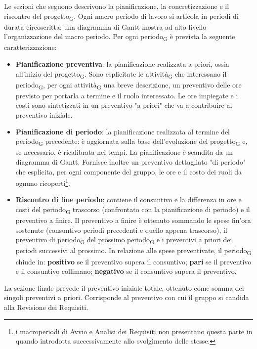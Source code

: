 Le sezioni che seguono descrivono la pianificazione, la concretizzazione e il riscontro del progetto\textsubscript{G}. Ogni macro periodo di lavoro si articola in periodi di durata circoscritta: una diagramma di Gantt mostra ad alto livello l'organizzazione del macro periodo. Per ogni periodo\textsubscript{G} è prevista la seguente caratterizzazione:
\begin{itemize}
	\item \textbf{Pianificazione preventiva}: la pianificazione realizzata a priori, ossia all'inizio del progetto\textsubscript{G}. Sono esplicitate le attività\textsubscript{G} che interessano il periodo\textsubscript{G}, per ogni attività\textsubscript{G} una breve descrizione, un preventivo delle ore previsto per portarla a termine e il ruolo interessato. Le ore impiegate e i costi sono sintetizzati in un preventivo "a priori" che va a contribuire al preventivo iniziale.
	
	\item \textbf{Pianificazione di periodo}: la pianificazione realizzata al termine del periodo\textsubscript{G} precedente: è aggiornata sulla base dell'evoluzione del progetto\textsubscript{G} e, se necessario, è ricalibrata nei tempi. La pianificazione è scandita da un diagramma di Gantt. Fornisce inoltre un preventivo dettagliato "di periodo" che esplicita, per ogni componente del gruppo, le ore e il costo dei ruoli da ognuno ricoperti\footnote{i macroperiodi di Avvio e Analisi dei Requisiti non presentano questa parte in quando introdotta successivamente allo svolgimento delle stesse.}.
	
	\item \textbf{Riscontro di fine periodo}: contiene il consuntivo e la differenza in ore e costi del periodo\textsubscript{G} trascorso (confrontato con la pianificazione di periodo) e il preventivo a finire. Il preventivo a finire è ottenuto sommando le spese fin'ora sostenute (consuntivo periodi precedenti e quello appena trascorso), il preventivo di periodo\textsubscript{G} del prossimo periodo\textsubscript{G} e i preventivi a priori dei periodi successivi al prossimo. In relazione alle spese preventivate, il periodo\textsubscript{G} chiude in: \textbf{positivo} se il preventivo supera il consuntivo; \textbf{pari} se il preventivo e il consuntivo collimano; \textbf{negativo} se il consuntivo supera il preventivo.
	
\end{itemize}

La sezione finale prevede il preventivo iniziale totale, ottenuto come somma dei singoli preventivi a priori. Corrisponde al preventivo con cui il gruppo si candida alla Revisione dei Requisiti.
